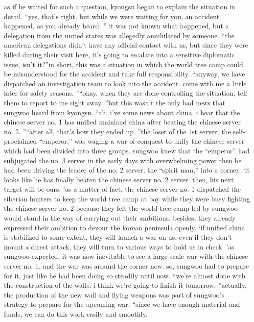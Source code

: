 as if he waited for such a question, kyongsu began to explain the situation in detail.
“yes, that's right.
 but while we were waiting for you, an accident happened, as you already heard.
”
it was not known what happened, but a delegation from the united states was allegedly annihilated by someone.
“the american delegations didn't have any official contact with us, but since they were killed during their visit here, it's going to escalate into a sensitive diplomatic issue, isn't it?”in short, this was a situation in which the world tree camp could be misunderstood for the accident and take full responsibility.
“anyway, we have dispatched an investigation team to look into the accident.
 come with me a little later for safety reasons.
”“okay.
 when they are done controlling the situation, tell them to report to me right away.
”but this wasn't the only bad news that sungwoo heard from kyongsu.
“ah, i've some news about china.
 i hear that the chinese server no.
 1 has unified mainland china after beating the chinese server no.
2.
”“after all, that's how they ended up.
”the loser of the 1st server, the self-proclaimed “emperor,” was waging a war of conquest to unify the chinese server which had been divided into three groups.
sungwoo knew that the “emperor” had subjugated the no.
 3 server in the early days with overwhelming power then he had been driving the leader of the no.
 2 server, the “spirit man,” into a corner.
‘it looks like he has finally beaten the chinese server no.
 2 server.
 then, his next target will be ours.
'as a matter of fact, the chinese server no.
 1 dispatched the siberian hunters to keep the world tree camp at bay while they were busy fighting the chinese server no.
 2 because they felt the world tree camp led by sungwoo would stand in the way of carrying out their ambitions.
 besides, they already expressed their ambition to devour the korean peninsula openly.
‘if unified china is stabilized to some extent, they will launch a war on us.
 even if they don't mount a direct attack, they will turn to various ways to hold us in check.
'as sungwoo expected, it was now inevitable to see a large-scale war with the chinese server no.
 1.
 and the war was around the corner now.
 so, sungwoo had to prepare for it, just like he had been doing so steadily until now.
“we're almost done with the construction of the walls.
 i think we're going to finish it tomorrow.
”actually, the production of the new wall and flying weapons was part of sungwoo's strategy to prepare for the upcoming war.
“since we have enough material and funds, we can do this work easily and smoothly.
